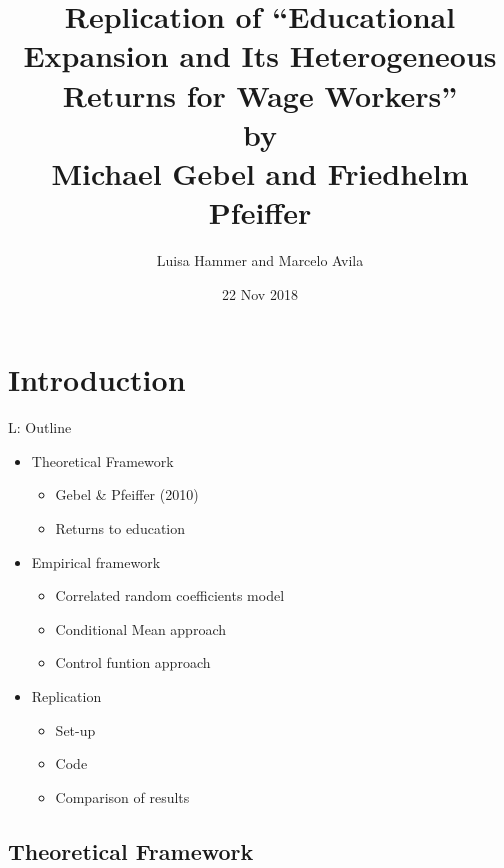 \documentclass[10pt,ignorenonframetext,]{beamer}
\title{Replication of ``Educational Expansion and Its Heterogeneous Returns for
Wage Workers''\\
by\\
Michael Gebel and Friedhelm Pfeiffer}
\author{Luisa Hammer and Marcelo Avila}
\date{22 Nov 2018}
\providecommand{\tightlist}{%
  \setlength{\itemsep}{0pt}\setlength{\parskip}{0pt}}
\begin{document}
\frame{\titlepage}

\hypertarget{introduction}{%
\section{Introduction}\label{introduction}}

\begin{frame}{L: Outline}
\protect\hypertarget{l-outline}{}

\begin{itemize}
\item
  Theoretical Framework

  \begin{itemize}
  \tightlist
  \item
    Gebel \& Pfeiffer (2010)
  \item
    Returns to education
  \end{itemize}
\item
  Empirical framework

  \begin{itemize}
  \tightlist
  \item
    Correlated random coefficients model
  \item
    Conditional Mean approach
  \item
    Control funtion approach
  \end{itemize}
\item
  Replication

  \begin{itemize}
  \tightlist
  \item
    Set-up
  \item
    Code
  \item
    Comparison of results
  \end{itemize}
\end{itemize}

\end{frame}

\hypertarget{theoretical-framework}{%
\subsection{Theoretical Framework}\label{theoretical-framework}}
\end{document}
